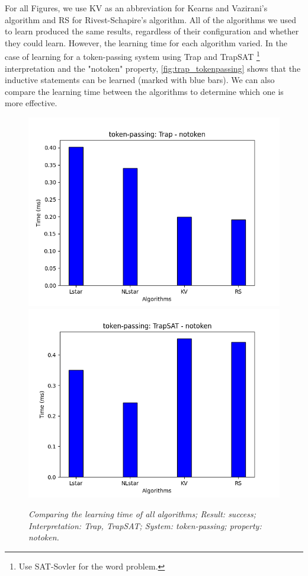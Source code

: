 For all Figures, we use KV as an abbreviation for Kearns and Vazirani's algorithm and RS for Rivest-Schapire's algorithm.
All of the algorithms we used to learn produced the same results, regardless of their configuration and whether they could learn. 
However, the learning time for each algorithm varied. 
In the case of learning for a token-passing system using Trap and TrapSAT \footnote{\label{foot:sat}Use SAT-Sovler for the word problem.} interpretation and the "notoken" property,
\autoref{fig:trap_tokenpassing} shows that the inductive statements can be learned (marked with blue bars). 
We can also compare the learning time between the algorithms to determine which one is more effective.
\begin{figure}[h]
    \includegraphics[scale=0.5]{figures/Trap_notoken.png}
    \includegraphics[scale=0.5]{figures/TrapSAT_notoken.png}
    \caption{\textit{Comparing the learning time of all algorithms; Result: success; Interpretation: Trap, TrapSAT; System: token-passing; property: notoken.}} 
    \label{fig:trap_tokenpassing}
\end{figure}

